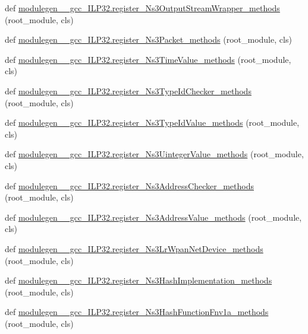 \begin{DoxyCompactItemize}
\item 
def \hyperlink{namespacemodulegen____gcc__ILP32_a8e9fcb242da1166eddf53267a12bfdbb}{modulegen\+\_\+\+\_\+gcc\+\_\+\+I\+L\+P32.\+register\+\_\+\+Ns3\+Output\+Stream\+Wrapper\+\_\+methods} (root\+\_\+module, cls)
\item 
def \hyperlink{namespacemodulegen____gcc__ILP32_ac954ddbcc06ada408c4168d841f1ac53}{modulegen\+\_\+\+\_\+gcc\+\_\+\+I\+L\+P32.\+register\+\_\+\+Ns3\+Packet\+\_\+methods} (root\+\_\+module, cls)
\item 
def \hyperlink{namespacemodulegen____gcc__ILP32_a1105d61b4c389df61b8b83b0a25cc654}{modulegen\+\_\+\+\_\+gcc\+\_\+\+I\+L\+P32.\+register\+\_\+\+Ns3\+Time\+Value\+\_\+methods} (root\+\_\+module, cls)
\item 
def \hyperlink{namespacemodulegen____gcc__ILP32_a8cc76f23a8cb33ad3a0e4d77e8fbee0a}{modulegen\+\_\+\+\_\+gcc\+\_\+\+I\+L\+P32.\+register\+\_\+\+Ns3\+Type\+Id\+Checker\+\_\+methods} (root\+\_\+module, cls)
\item 
def \hyperlink{namespacemodulegen____gcc__ILP32_a39c112d1c935b295e15786cb622c73a5}{modulegen\+\_\+\+\_\+gcc\+\_\+\+I\+L\+P32.\+register\+\_\+\+Ns3\+Type\+Id\+Value\+\_\+methods} (root\+\_\+module, cls)
\item 
def \hyperlink{namespacemodulegen____gcc__ILP32_ac714dce8d474460352595c8579b4b110}{modulegen\+\_\+\+\_\+gcc\+\_\+\+I\+L\+P32.\+register\+\_\+\+Ns3\+Uinteger\+Value\+\_\+methods} (root\+\_\+module, cls)
\item 
def \hyperlink{namespacemodulegen____gcc__ILP32_a6cddc7786a1240bac0c2c11d2e5e40f3}{modulegen\+\_\+\+\_\+gcc\+\_\+\+I\+L\+P32.\+register\+\_\+\+Ns3\+Address\+Checker\+\_\+methods} (root\+\_\+module, cls)
\item 
def \hyperlink{namespacemodulegen____gcc__ILP32_a73078c37ac27c6fd2ec5e6a012ec4c0d}{modulegen\+\_\+\+\_\+gcc\+\_\+\+I\+L\+P32.\+register\+\_\+\+Ns3\+Address\+Value\+\_\+methods} (root\+\_\+module, cls)
\item 
def \hyperlink{namespacemodulegen____gcc__ILP32_aaf56286520268cff3c38d89d3981e1a2}{modulegen\+\_\+\+\_\+gcc\+\_\+\+I\+L\+P32.\+register\+\_\+\+Ns3\+Lr\+Wpan\+Net\+Device\+\_\+methods} (root\+\_\+module, cls)
\item 
def \hyperlink{namespacemodulegen____gcc__ILP32_acbacaf626a5a437cc46ab734cfde3cb8}{modulegen\+\_\+\+\_\+gcc\+\_\+\+I\+L\+P32.\+register\+\_\+\+Ns3\+Hash\+Implementation\+\_\+methods} (root\+\_\+module, cls)
\item 
def \hyperlink{namespacemodulegen____gcc__ILP32_a8a8387218e2c3d882054e6b56a6a4b07}{modulegen\+\_\+\+\_\+gcc\+\_\+\+I\+L\+P32.\+register\+\_\+\+Ns3\+Hash\+Function\+Fnv1a\+\_\+methods} (root\+\_\+module, cls)

\end{DoxyCompactItemize}
